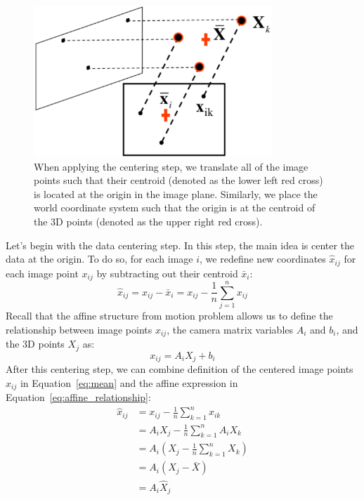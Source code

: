 \documentclass[a4paper, 12pt]{article}
\numberwithin{equation}{section}
\begin{document}
\begin{figure}[h!]
\centering
\includegraphics[width=0.8\textwidth]{figures/factorization_centering.png}
\caption{When applying the centering step, we translate all of the image points such that their centroid (denoted as the lower left red cross) is located at the origin in the image plane. Similarly, we place the world coordinate system such that the origin is at the centroid of the 3D points (denoted as the upper right red cross).}
\label{fig:factorization_centering}
\end{figure}

Let’s begin with the data centering step. In this step, the main idea is center the data at the origin. To do so, for each image $i$, we redefine new coordinates $\hat{x}_{ij}$ for each image point $x_{ij}$ by subtracting out their centroid $\bar{x}_i$:
\begin{equation}
    \hat{x}_{ij} = x_{ij} - \bar{x}_{i} = x_{ij} - \frac{1}{n}\sum_{j=1}^{n}{x_{ij}}
    \label{eq:mean}
\end{equation}
Recall that the affine structure from motion problem allows us to define the relationship between image points $x_{ij}$, the camera matrix variables $A_i$ and $b_i$, and the 3D points $X_j$ as:
\begin{equation}
    x_{ij}= A_i X_j + b_i
    \label{eq:affine_relationship}
\end{equation}
After this centering step, we can combine definition of the centered image points $\hat{x}_{ij}$ in Equation~\ref{eq:mean} and the affine expression in Equation~\ref{eq:affine_relationship}:
\begin{equation}
\begin{split}
    \hat{x}_{ij} &= x_{ij} -  \frac{1}{n}\sum_{k=1}^{n}{x_{ik}}\\
    & = A_iX_j - \frac{1}{n}\sum_{k=1}^{n}{A_i X_k}\\
    & = A_i(X_j - \frac{1}{n}\sum_{k=1}^{n} X_k) \\ 
    & = A_i(X_j - \bar{X})\\
    & = A_i\hat{X}_j
\end{split}
\label{eq:centered_relationship}
\end{equation}
\end{document}
